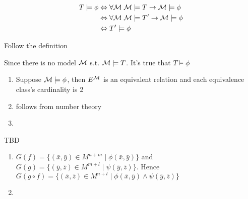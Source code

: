\documentclass[11pt]{article}
\begin{document}
\begin{exercise}
\begin{align*}
T\models\phi&\Leftrightarrow\forall \mathcal{M}\;\mathcal{M}\models T\to\mathcal{M}\models\phi\\
&\Leftrightarrow\forall \mathcal{M}\;\mathcal{M}\models T'\to\mathcal{M}\models\phi\\
&\Leftrightarrow T'\models\phi
\end{align*}
\end{exercise}

\begin{exercise}
Follow the definition
\end{exercise}

\begin{exercise}
Since there is no model $\mathcal{M}$ s.t. $\mathcal{M}\models T$. It's true that 
$T\models \phi$
\end{exercise}

\begin{exercise}
\begin{enumerate}

\item Suppose $\mathcal{M}\models\phi$, then $E^{\mathcal{M}}$ is an equivalent relation and
each equivalence class's cardinality is 2
\item follows from number theory
\item \cite{DBLP:journals/bsl/DurandJMM12}
\end{enumerate}
\end{exercise}

\begin{exercise}
TBD
\end{exercise}

\begin{exercise}
\begin{enumerate}
\item $G(f)=\{(\bar{x},\bar{y})\in M^{n+m}\mid\phi(\bar{x},\bar{y})\}$ and 
$G(g)=\{(\bar{y},\bar{z})\in M^{m+l}\mid\psi(\bar{y},\bar{z})\}$. Hence
$G(g\circ f)=\{(\bar{x},\bar{z})\in M^{n+l}\mid \phi(\bar{x},\bar{y})
\wedge \psi(\bar{y},\bar{z})\}$
\item 
\end{enumerate}
\end{exercise}



\end{document}
